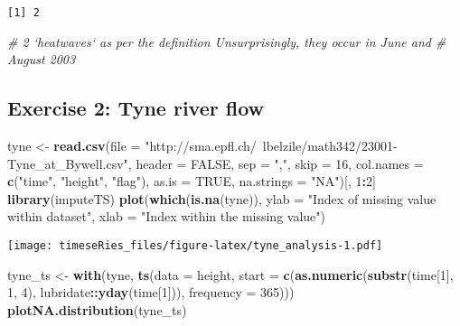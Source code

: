 \documentclass[]{book}
\newenvironment{Shaded}{\begin{snugshade}}{\end{snugshade}}
\newcommand{\KeywordTok}[1]{\textcolor[rgb]{0.13,0.29,0.53}{\textbf{#1}}}
\newcommand{\DataTypeTok}[1]{\textcolor[rgb]{0.13,0.29,0.53}{#1}}
\newcommand{\DecValTok}[1]{\textcolor[rgb]{0.00,0.00,0.81}{#1}}
\newcommand{\StringTok}[1]{\textcolor[rgb]{0.31,0.60,0.02}{#1}}
\newcommand{\CommentTok}[1]{\textcolor[rgb]{0.56,0.35,0.01}{\textit{#1}}}
\newcommand{\OtherTok}[1]{\textcolor[rgb]{0.56,0.35,0.01}{#1}}
\newcommand{\OperatorTok}[1]{\textcolor[rgb]{0.81,0.36,0.00}{\textbf{#1}}}
\newcommand{\NormalTok}[1]{#1}
\begin{document}
\begin{verbatim}
[1] 2
\end{verbatim}

\begin{Shaded}
\begin{Highlighting}[]
\CommentTok{# 2 `heatwaves` as per the definition Unsurprisingly, they occur in June and}
\CommentTok{# August 2003}
\end{Highlighting}
\end{Shaded}

\subsection{Exercise 2: Tyne river
flow}\label{exercise-2-tyne-river-flow-1}

\begin{Shaded}
\begin{Highlighting}[]
\NormalTok{tyne <-}\StringTok{ }\KeywordTok{read.csv}\NormalTok{(}\DataTypeTok{file =} \StringTok{"http://sma.epfl.ch/~lbelzile/math342/23001-Tyne_at_Bywell.csv"}\NormalTok{, }
    \DataTypeTok{header =} \OtherTok{FALSE}\NormalTok{, }\DataTypeTok{sep =} \StringTok{","}\NormalTok{, }\DataTypeTok{skip =} \DecValTok{16}\NormalTok{, }\DataTypeTok{col.names =} \KeywordTok{c}\NormalTok{(}\StringTok{"time"}\NormalTok{, }\StringTok{"height"}\NormalTok{, }\StringTok{"flag"}\NormalTok{), }
    \DataTypeTok{as.is =} \OtherTok{TRUE}\NormalTok{, }\DataTypeTok{na.strings =} \StringTok{"NA"}\NormalTok{)[, }\DecValTok{1}\OperatorTok{:}\DecValTok{2}\NormalTok{]}
\KeywordTok{library}\NormalTok{(imputeTS)}
\KeywordTok{plot}\NormalTok{(}\KeywordTok{which}\NormalTok{(}\KeywordTok{is.na}\NormalTok{(tyne)), }\DataTypeTok{ylab =} \StringTok{"Index of missing value within dataset"}\NormalTok{, }\DataTypeTok{xlab =} \StringTok{"Index within the missing value"}\NormalTok{)}
\end{Highlighting}
\end{Shaded}

\texttt{[image: timeseRies\_files/figure-latex/tyne\_analysis-1.pdf]}

\begin{Shaded}
\begin{Highlighting}[]
\NormalTok{tyne_ts <-}\StringTok{ }\KeywordTok{with}\NormalTok{(tyne, }\KeywordTok{ts}\NormalTok{(}\DataTypeTok{data =}\NormalTok{ height, }\DataTypeTok{start =} \KeywordTok{c}\NormalTok{(}\KeywordTok{as.numeric}\NormalTok{(}\KeywordTok{substr}\NormalTok{(time[}\DecValTok{1}\NormalTok{], }
    \DecValTok{1}\NormalTok{, }\DecValTok{4}\NormalTok{), lubridate}\OperatorTok{::}\KeywordTok{yday}\NormalTok{(time[}\DecValTok{1}\NormalTok{])), }\DataTypeTok{frequency =} \DecValTok{365}\NormalTok{)))}
\KeywordTok{plotNA.distribution}\NormalTok{(tyne_ts)}
\end{Highlighting}
\end{Shaded}
\end{document}
